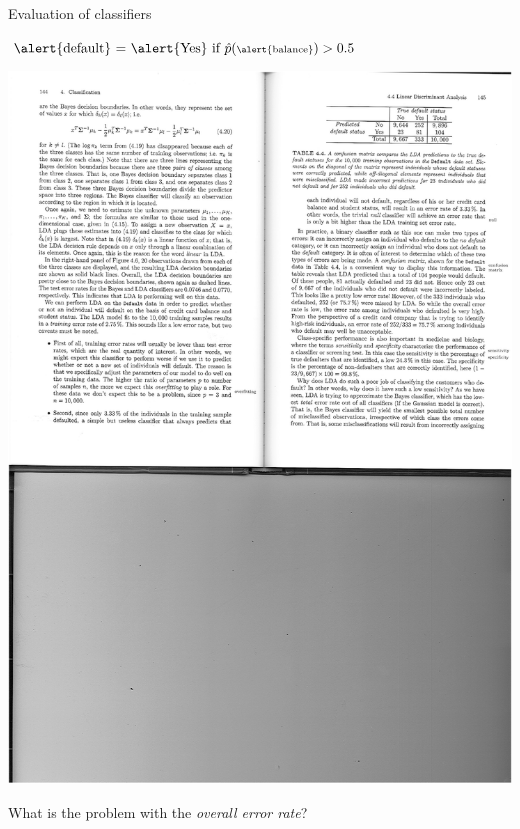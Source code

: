 \documentclass[14pt]{beamer}
\begin{document}
\begin{frame}{Evaluation of classifiers}


$\text{\alert{default} = \alert{Yes}} \text{~if~} \scriptsize \hat p(\text{\alert{balance}}) > 0.5 $
\centerline{\includegraphics[width=.7\textwidth]{Table4}}

What is the problem with the \emph{overall error rate}?

\end{frame}
\end{document}
